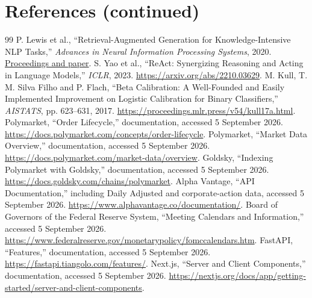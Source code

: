 \section*{References (continued)}
\begin{thebibliography}{99}
\setcounter{enumiv}{16}
\setlength{\itemsep}{7pt}
 P. Lewis et al., ``Retrieval-Augmented Generation for Knowledge-Intensive NLP Tasks,'' \textit{Advances in Neural Information Processing Systems}, 2020. \href{https://papers.nips.cc/paper_files/paper/2020/hash/6b493230205f780e1bc26945df7481e5-Abstract.html}{Proceedings and paper}.
 S. Yao et al., ``ReAct: Synergizing Reasoning and Acting in Language Models,'' \textit{ICLR}, 2023. \url{https://arxiv.org/abs/2210.03629}.
 M. Kull, T. M. Silva Filho and P. Flach, ``Beta Calibration: A Well-Founded and Easily Implemented Improvement on Logistic Calibration for Binary Classifiers,'' \textit{AISTATS}, pp. 623--631, 2017. \url{https://proceedings.mlr.press/v54/kull17a.html}.
 Polymarket, ``Order Lifecycle,'' documentation, accessed 5 September 2026. \url{https://docs.polymarket.com/concepts/order-lifecycle}.
 Polymarket, ``Market Data Overview,'' documentation, accessed 5 September 2026. \url{https://docs.polymarket.com/market-data/overview}.
 Goldsky, ``Indexing Polymarket with Goldsky,'' documentation, accessed 5 September 2026. \url{https://docs.goldsky.com/chains/polymarket}.
 Alpha Vantage, ``API Documentation,'' including Daily Adjusted and corporate-action data, accessed 5 September 2026. \url{https://www.alphavantage.co/documentation/}.
 Board of Governors of the Federal Reserve System, ``Meeting Calendars and Information,'' accessed 5 September 2026. \url{https://www.federalreserve.gov/monetarypolicy/fomccalendars.htm}.
 FastAPI, ``Features,'' documentation, accessed 5 September 2026. \url{https://fastapi.tiangolo.com/features/}.
 Next.js, ``Server and Client Components,'' documentation, accessed 5 September 2026. \url{https://nextjs.org/docs/app/getting-started/server-and-client-components}.
\end{thebibliography}
\endgroup
